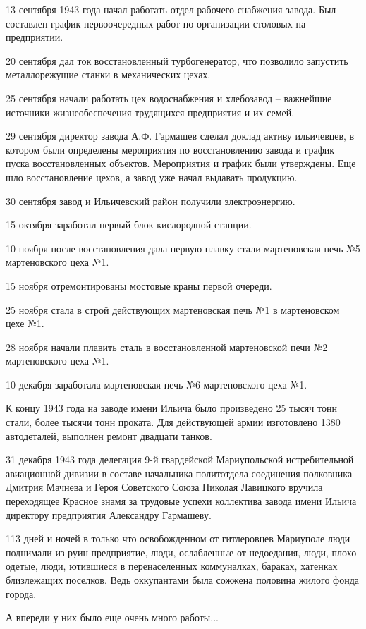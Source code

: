 13 сентября 1943 года начал работать отдел рабочего снабжения завода. Был
составлен график первоочередных работ по организации столовых на предприятии.

20 сентября дал ток восстановленный турбогенератор, что позволило запустить
металлорежущие станки в механических цехах.

25 сентября начали работать цех водоснабжения и хлебозавод – важнейшие
источники жизнеобеспечения трудящихся предприятия и их семей.

29 сентября директор завода А.Ф. Гармашев сделал доклад активу ильичевцев, в
котором были определены мероприятия по восстановлению завода и график пуска
восстановленных объектов. Мероприятия и график были утверждены. Еще шло
восстановление цехов, а завод уже начал выдавать продукцию.

30 сентября завод и Ильичевский район получили электроэнергию.

15 октября заработал первый блок кислородной станции.

10 ноября после восстановления дала первую плавку стали мартеновская печь №5
мартеновского цеха №1.

15 ноября отремонтированы мостовые краны первой очереди.

25 ноября стала в строй действующих мартеновская печь №1 в мартеновском цехе
№1.

28 ноября начали плавить сталь в восстановленной мартеновской печи №2
мартеновского цеха №1.

10 декабря заработала мартеновская печь №6 мартеновского цеха №1.

К концу 1943 года на заводе имени Ильича было произведено 25 тысяч тонн стали,
более тысячи тонн проката. Для действующей армии изготовлено 1380 автодеталей,
выполнен ремонт двадцати танков.

31 декабря 1943 года делегация 9-й гвардейской Мариупольской истребительной
авиаци­онной дивизии в составе начальника политотдела соединения полковника
Дмитрия Мачнева и Героя Советского Союза Николая Лавицкого вручила переходящее
Красное знамя за трудовые успехи коллектива завода имени Ильича директору
предприятия Александру Гармашеву.

113 дней и ночей в только что освобожденном от гитлеровцев Мариуполе люди
поднимали из руин предприятие, люди, ослабленные от недоедания, люди, плохо
одетые, люди, ютившиеся в перенаселенных коммуналках, бараках, хатенках
близлежащих поселков. Ведь оккупантами была сожжена половина жилого фонда
города.

А впереди у них было еще очень много работы...
